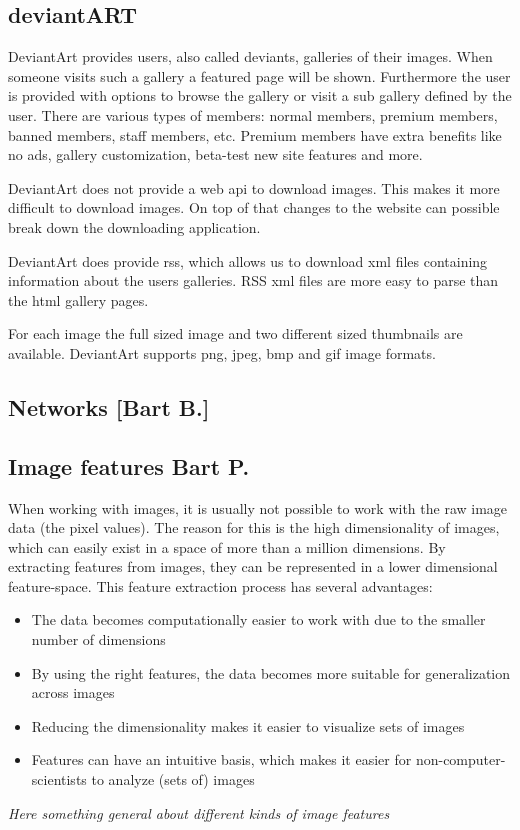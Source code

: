 \subsection{deviantART}
DeviantArt provides users, also called deviants, galleries of their images. 
When someone visits such a gallery a featured page will be shown. Furthermore
the user is provided with options to browse the gallery or visit a sub gallery
defined by the user. There are various types of members: normal members, premium 
members, banned members, staff members, etc. Premium members have extra benefits
like no ads, gallery customization, beta-test new site features and more.

DeviantArt does not provide a web api to download images. This makes it more 
difficult to download images. On top of that changes to the website can possible break
down the downloading application.

DeviantArt does provide rss, which allows us to download xml files containing 
information about the users galleries. RSS xml files are more easy to parse
than the html gallery pages.

For each image the full sized image and two different sized thumbnails are 
available. DeviantArt supports png, jpeg, bmp and gif image formats.

\subsection{Networks [Bart B.]}

\subsection{Image features  Bart P.}
When working with images, it is usually not possible to work with the raw image data (the pixel values). The reason for this is the high dimensionality of images, which can easily exist in a space of more than a million dimensions. By extracting features from images, they can be represented in a lower dimensional feature-space.  This feature extraction process has several advantages:
\begin{itemize}
\item The data becomes computationally easier to work with due to the smaller number of dimensions
\item By using the right features, the data becomes more suitable for generalization across images
\item Reducing the dimensionality makes it easier to visualize sets of images
\item Features can have an intuitive basis, which makes it easier for non-computer-scientists to analyze (sets of) images
\end{itemize}
\textit{Here something general about different kinds of image features}

